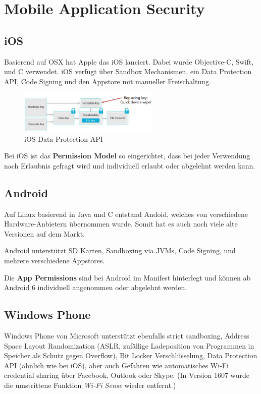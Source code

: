 \section{Mobile Application Security}

\subsection{iOS}
Basierend auf OSX hat Apple das iOS lanciert. Dabei wurde Objective-C, Swift, und C verwendet. iOS verfügt über Sandbox Mechanismen, ein Data Protection API, Code Signing und den Appstore mit manueller Freischaltung.

\begin{figure}[H]
	\centering
	\includegraphics[width=0.6\textwidth]{./img/mobileappsecurity_iOS-DataProtectionAPI}
	\caption{iOS Data Protection API}
\end{figure}

Bei iOS ist das \textbf{Permission Model} so eingerichtet, dass bei jeder Verwendung nach Erlaubnis gefragt wird und individuell erlaubt oder abgelehnt werden kann.

\subsection{Android}
Auf Linux basierend in Java und C entstand Andoid, welches von verschiedene Hardware-Anbietern übernommen wurde. Somit hat es auch noch viele alte Versionen auf dem Markt.

Android unterstützt SD Karten, Sandboxing via JVMs, Code Signing, und mehrere verschiedene Appstores.

Die \textbf{App Permissions} sind bei Android im Manifest hinterlegt und können ab Android 6 individuell angenommen oder abgelehnt werden.

\subsection{Windows Phone}
Windows Phone von Microsoft unterstützt ebenfalls strict sandboxing, Address Space Layout Randomization (ASLR, zufällige Ladeposition von Programmen in Speicher als Schutz gegen Overflow), Bit Locker Verschlüsselung, Data Protection API (ähnlich wie bei iOS), aber auch Gefahren wie automatisches Wi-Fi credential sharing über Facebook, Outlook oder Skype. (In Version 1607 wurde die umstrittene Funktion \textit{Wi-Fi Sense} wieder entfernt.)

